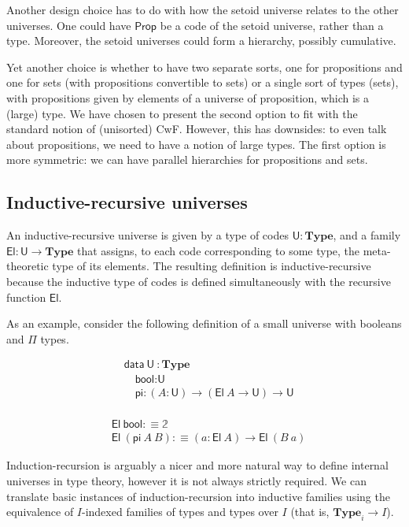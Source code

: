 \documentclass{easychair}
\newcommand{\mType}{\mathbf{Type}}
\newcommand{\Prop}{\textsf{Prop}}
\newcommand{\U}{\textsf{U}}
\newcommand{\El}{\textsf{El}}
\providecommand\mathbbm{\mathbb}
\begin{document}
Another design choice has to do with how the setoid universe relates to the
other universes. One could have $\Prop$ be a code of the setoid universe, rather
than a type. Moreover, the setoid universes could form a hierarchy, possibly
cumulative.

Yet another choice is whether to have two separate sorts, one for propositions
and one for sets (with propositions convertible to sets) or a single sort of
types (sets), with propositions given by elements of a universe of proposition,
which is a (large) type. We have chosen to present the second option to fit with
the standard notion of (unisorted) CwF. However, this has downsides: to even
talk about propositions, we need to have a notion of large types. The first
option is more symmetric: we can have parallel hierarchies for propositions and
sets.

\subsection{Inductive-recursive universes}\label{ir-universes}

An inductive-recursive universe is given by a type of codes $\U : \mType$, and a
family $\El : \U \to \mType$ that assigns, to each code corresponding to some
type, the meta-theoretic type of its elements. The resulting definition is
inductive-recursive because the inductive type of codes is defined
simultaneously with the recursive function $\El$.

As an example, consider the following definition of a small universe with
booleans and $\Pi$ types.

\begin{minipage}{0.45\textwidth}
\begin{align*}
  & \textsf{data}\ \U\ : \mType \\
  & \quad \textsf{bool} : \U \\
  & \quad \textsf{pi} : (A : \U) \to (\El\ A \to \U) \to \U \\
\end{align*}
\end{minipage}
\begin{minipage}{0.45\textwidth}
\begin{align*}
  & \El\ \textsf{bool} :\equiv \mathbbm{2} \\
  & \El\ (\textsf{pi}\ A\ B) :\equiv (a : \El\ A) \to \El\ (B\ a)
\end{align*}
\end{minipage}

Induction-recursion is arguably a nicer and more natural way to define internal
universes in type theory, however it is not always strictly required.
%
We can translate basic instances of induction-recursion into inductive families
using the equivalence of $I$-indexed families of types and types over $I$
(that is, $\mType_i \to I$).
\end{document}
